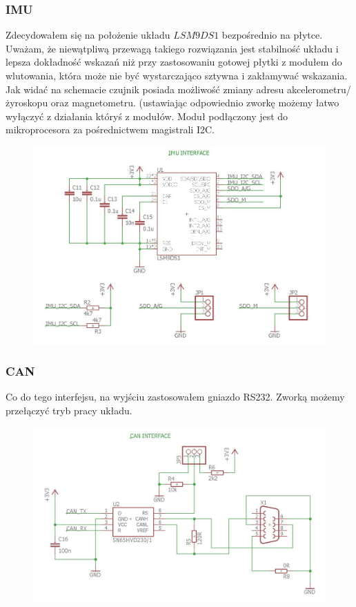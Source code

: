 \documentclass[12pt]{article}
\begin{document}
\subsubsection{IMU}
Zdecydowałem się na położenie układu $LSM9DS1$ bezpośrednio na płytce. Uważam, że niewątpliwą przewagą takiego rozwiązania jest stabilność układu i lepsza dokładność wskazań niż przy zastosowaniu gotowej płytki z modułem do wlutowania, która może nie być wystarczająco sztywna i zakłamywać wskazania. Jak widać na schemacie czujnik posiada możliwość zmiany adresu akcelerometru/żyroskopu oraz magnetometru. (ustawiając odpowiednio zworkę możemy łatwo wyłączyć z działania któryś z modułów. Moduł podłączony jest do mikroprocesora za pośrednictwem magistrali I2C. 
\begin{figure}[H]
\begin{center}
\includegraphics[width=1\textwidth]{figures/schemat3.jpg}
\end{center}
\end{figure}
\subsubsection{CAN}
Co do tego interfejsu, na wyjściu zastosowałem gniazdo RS232. Zworką możemy przełączyć tryb pracy układu.
\begin{figure}[H]
\begin{center}
\includegraphics[width=1\textwidth]{figures/schemat4.jpg}
\end{center}
\end{figure}
\end{document}
